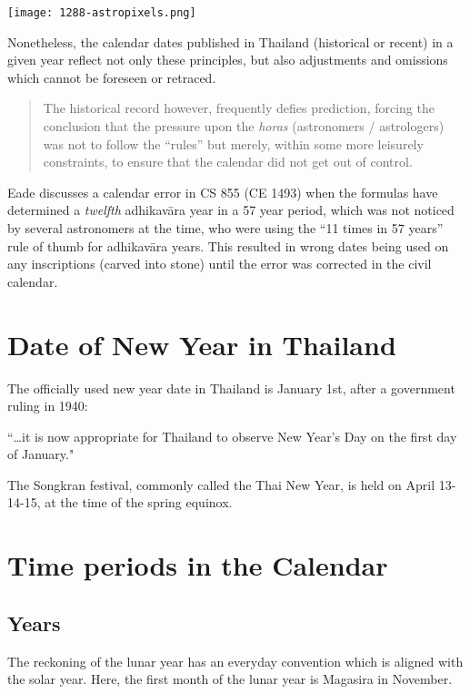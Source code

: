 \documentclass[11pt,oneside]{memoir-article}
\begin{document}
{\centering
\texttt{[image: 1288-astropixels.png]}
\par}

Nonetheless, the calendar dates published in Thailand (historical or
recent) in a given year reflect not only these principles, but also
adjustments and omissions which cannot be foreseen or retraced.

\begin{quote}
The historical record however, frequently defies prediction, forcing
the conclusion that the pressure upon the \emph{horas} (astronomers /
astrologers) was not to follow the ``rules'' but merely, within some
more leisurely constraints, to ensure that the calendar did not get
out of control.\autocite{eade1995calendrical}
\end{quote}

Eade discusses a calendar error in CS 855 (CE 1493) when the formulas have
determined a \emph{twelfth} adhikavāra year in a 57 year period, which was not
noticed by several astronomers at the time, who were using the ``11 times in 57
years'' rule of thumb for adhikavāra years. This resulted in wrong dates being
used on any inscriptions (carved into stone) until the error was corrected in
the civil calendar.\autocite{eade2007irregular}

\section{Date of New Year in Thailand}
\label{sec-3-1}

The officially used new year date in Thailand is January 1st, after a government
ruling in 1940:

``\ldots{}it is now appropriate for Thailand to observe New Year's Day on the first
day of January."\autocite{wp-thai-new-year-day}

The Songkran festival, commonly called the Thai New Year, is held on April
13-14-15, at the time of the spring equinox.

\section{Time periods in the Calendar}
\label{sec-3-2}
\label{years-seasons}

\subsection{Years}
\label{sec-3-2-1}

The reckoning of the lunar year has an everyday convention which is aligned with
the solar year. Here, the first month of the lunar year is Magasira in November.
\end{document}
